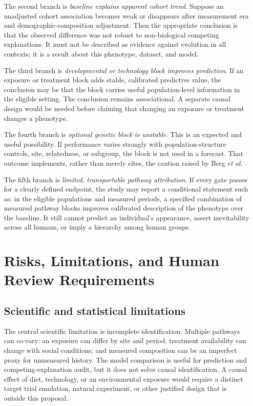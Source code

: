 \documentclass[conference]{IEEEtran}
\begin{document}
The second branch is \emph{baseline explains apparent cohort trend}. Suppose
an unadjusted cohort association becomes weak or disappears after measurement
era and demographic-composition adjustment. Then the appropriate conclusion
is that the observed difference was not robust to non-biological competing
explanations. It must not be described as evidence against evolution in all
contexts; it is a result about this phenotype, dataset, and model.

The third branch is \emph{developmental or technology block improves
prediction}. If an exposure or treatment block adds stable, calibrated
predictive value, the conclusion may be that the block carries useful
population-level information in the eligible setting. The conclusion remains
associational. A separate causal design would be needed before claiming that
changing an exposure or treatment changes a phenotype.

The fourth branch is \emph{optional genetic block is unstable}. This is an
expected and useful possibility. If performance varies strongly with
population-structure controls, site, relatedness, or subgroup, the block is
not used in a forecast. That outcome implements, rather than merely cites,
the caution raised by Berg \emph{et al.} \cite{berg2019}.

The fifth branch is \emph{limited, transportable pathway attribution}. If
every gate passes for a clearly defined endpoint, the study may report a
conditional statement such as: in the eligible populations and measured
periods, a specified combination of measured pathway blocks improves
calibrated description of the phenotype over the baseline. It still cannot
predict an individual's appearance, assert inevitability across all humans, or
imply a hierarchy among human groups.

\section{Risks, Limitations, and Human Review Requirements}

\subsection{Scientific and statistical limitations}

The central scientific limitation is incomplete identification. Multiple
pathways can co-vary: an exposure can differ by site and period; treatment
availability can change with social conditions; and measured composition can
be an imperfect proxy for unmeasured history. The model comparison is useful
for prediction and competing-explanation audit, but it does not solve causal
identification. A causal effect of diet, technology, or an environmental
exposure would require a distinct target trial emulation, natural experiment,
or other justified design that is outside this proposal.
\end{document}
